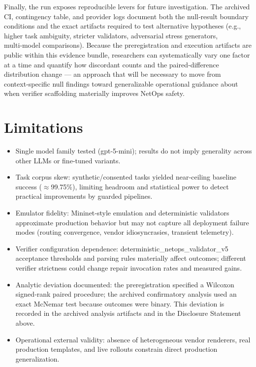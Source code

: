 \documentclass[conference]{IEEEtran}
\begin{document}
Finally, the run exposes reproducible levers for future investigation. The archived CI, contingency table, and provider logs document both the null‑result boundary conditions and the exact artifacts required to test alternative hypotheses (e.g., higher task ambiguity, stricter validators, adversarial stress generators, multi‑model comparisons). Because the preregistration and execution artifacts are public within this evidence bundle, researchers can systematically vary one factor at a time and quantify how discordant counts and the paired‑difference distribution change --- an approach that will be necessary to move from context‑specific null findings toward generalizable operational guidance about when verifier scaffolding materially improves NetOps safety.

\section{Limitations}
\begin{itemize}
\item Single model family tested (gpt-5-mini); results do not imply generality across other LLMs or fine‑tuned variants.
\item Task corpus skew: synthetic/consented tasks yielded near‑ceiling baseline success (\ensuremath{\approx}99.75\%), limiting headroom and statistical power to detect practical improvements by guarded pipelines.
\item Emulator fidelity: Mininet‑style emulation and deterministic validators approximate production behavior but may not capture all deployment failure modes (routing convergence, vendor idiosyncrasies, transient telemetry).
\item Verifier configuration dependence: deterministic\_netops\_validator\_v5 acceptance thresholds and parsing rules materially affect outcomes; different verifier strictness could change repair invocation rates and measured gains.
\item Analytic deviation documented: the preregistration specified a Wilcoxon signed‑rank paired procedure; the archived confirmatory analysis used an exact McNemar test because outcomes were binary. This deviation is recorded in the archived analysis artifacts and in the Disclosure Statement above.
\item Operational external validity: absence of heterogeneous vendor renderers, real production templates, and live rollouts constrain direct production generalization.
\end{itemize}
\end{document}
